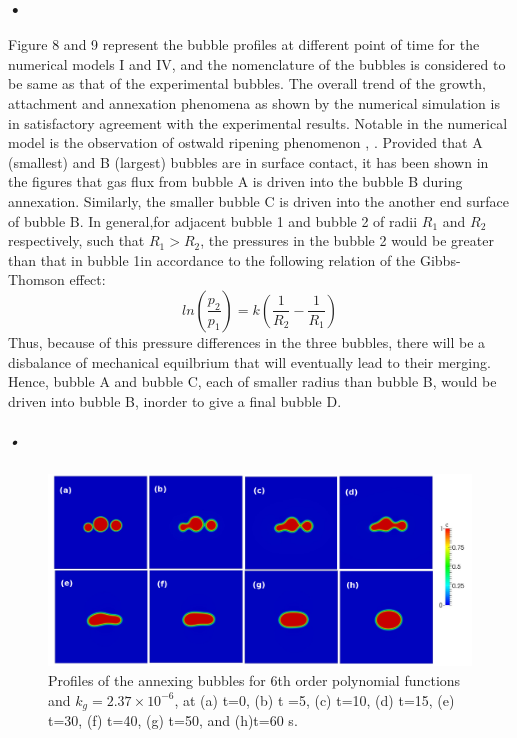 \documentclass[10pt,a4paper]{article}
\begin{document}
\subsubsection*{•}
Figure 8 and 9 represent the bubble profiles at different point of time for the numerical models I and IV, and the nomenclature of the bubbles is considered to be same as that of the experimental bubbles. The overall trend of the growth, attachment and annexation phenomena as shown by the numerical simulation is in satisfactory agreement with the experimental results. Notable in the numerical model is the observation of ostwald ripening phenomenon \citep{1}, \citep{10}. Provided that A (smallest) and B (largest) bubbles are in surface contact, it has been shown in the figures that gas flux from bubble A is driven into the bubble B during annexation. Similarly, the smaller bubble C is driven into the another end surface of bubble B. In general,for adjacent bubble 1 and bubble 2 of radii $R_1$ and $R_2$ respectively, such that $R_1 > R_2$, the pressures in the bubble 2 would be greater than that in bubble 1in accordance to the following relation of the Gibbs-Thomson effect:
\begin{equation}
ln(\frac{p_2}{p_1})= k (\frac{1}{R_2}-\frac{1}{R_1})
\end{equation} 
Thus, because of this pressure differences in the three bubbles, there will be a disbalance of mechanical equilbrium that will eventually lead to their merging. Hence, bubble A and bubble C, each of smaller radius than bubble B, would be driven into bubble B, inorder to give a final bubble D. 
\subparagraph*{•}
\begin{figure}
\caption{Profiles of the annexing bubbles for 6th order polynomial functions and $k_{g}= 2.37 \times 10 ^{-6}$, at (a) t=0, (b) t =5, (c) t=10, (d) t=15, (e) t=30, (f) t=40, (g) t=50, and (h)t=60 s.}
\centering
	\includegraphics[scale=0.175]{poly6iw33pg2104}
\end{figure}
\end{document}
